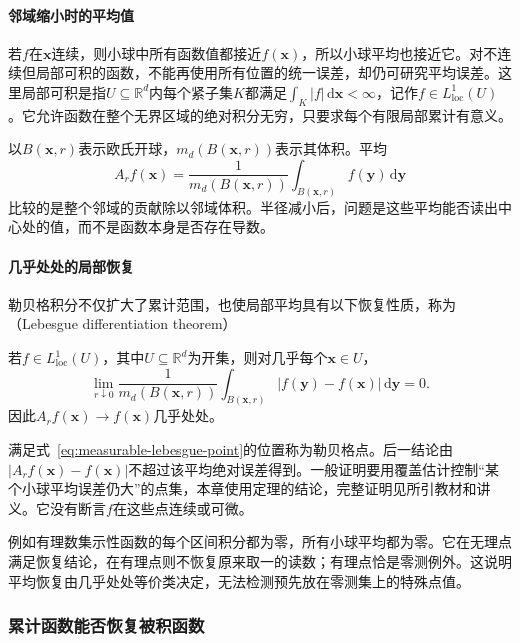 \paragraph{邻域缩小时的平均值}

若$f$在$\bm x$连续，则小球中所有函数值都接近$f(\bm x)$，所以小球平均也接近它。对不连续但局部可积的函数，不能再使用所有位置的统一误差，却仍可研究平均误差。这里局部可积是指$U\subseteq\mathbb R^d$内每个紧子集$K$都满足$\int_K|f|\,\mathrm d\bm x<\infty$，记作$f\in L^1_{\mathrm{loc}}(U)$。它允许函数在整个无界区域的绝对积分无穷，只要求每个有限局部累计有意义。

以$B(\bm x,r)$表示欧氏开球，$m_d(B(\bm x,r))$表示其体积。平均
\[
 A_rf(\bm x)=\frac1{m_d(B(\bm x,r))}\int_{B(\bm x,r)}f(\bm y)\,\mathrm d\bm y
\]
比较的是整个邻域的贡献除以邻域体积。半径减小后，问题是这些平均能否读出中心处的值，而不是函数本身是否存在导数。

\paragraph{几乎处处的局部恢复}

勒贝格积分不仅扩大了累计范围，也使局部平均具有以下恢复性质，称为（Lebesgue differentiation theorem）
\begin{theorem}[Lebesgue微分定理]
\label{thm:measurable-lebesgue-differentiation}
若$f\in L^1_{\mathrm{loc}}(U)$，其中$U\subseteq\mathbb R^d$为开集，则对几乎每个$\bm x\in U$，
\begin{equation}
 \lim_{r\downarrow0}\frac1{m_d(B(\bm x,r))}
 \int_{B(\bm x,r)}|f(\bm y)-f(\bm x)|\,\mathrm d\bm y=0.
\label{eq:measurable-lebesgue-point}
\end{equation}
因此$A_rf(\bm x)\to f(\bm x)$几乎处处。
\end{theorem}
满足式~\eqref{eq:measurable-lebesgue-point}的位置称为勒贝格点。后一结论由$|A_rf(\bm x)-f(\bm x)|$不超过该平均绝对误差得到。一般证明要用覆盖估计控制“某个小球平均误差仍大”的点集，本章使用定理的结论，完整证明见所引教材和讲义。它没有断言$f$在这些点连续或可微。

例如有理数集示性函数的每个区间积分都为零，所有小球平均都为零。它在无理点满足恢复结论，在有理点则不恢复原来取一的读数；有理点恰是零测例外。这说明平均恢复由几乎处处等价类决定，无法检测预先放在零测集上的特殊点值。

\subsubsection{累计函数能否恢复被积函数}
